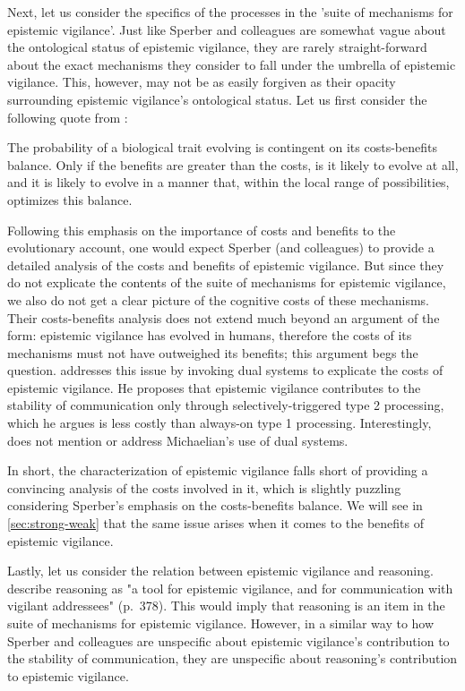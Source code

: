 Next, let us consider the specifics of the processes in the 'suite of mechanisms for epistemic vigilance'. Just like Sperber and colleagues are somewhat vague about the ontological status of epistemic vigilance, they are rarely straight-forward about the exact mechanisms they consider to fall under the umbrella of epistemic vigilance. This, however, may not be as easily forgiven as their opacity surrounding epistemic vigilance's ontological status. Let us first consider the following quote from \citet{Sperber13}:
\begin{quoting}
    The probability of a biological trait evolving is contingent on its costs-benefits balance. Only if the benefits are greater than the costs, is it likely to evolve at all, and it is likely to evolve in a manner that, within the local range of possibilities, optimizes this balance.
    \hfill \citep[p.~62]{Sperber13}
\end{quoting}
Following this emphasis on the importance of costs and benefits to the evolutionary account, one would expect Sperber (and colleagues) to provide a detailed analysis of the costs and benefits of epistemic vigilance.
But since they do not explicate the contents of the suite of mechanisms for epistemic vigilance, we also do not get a clear picture of the cognitive costs of these mechanisms.
Their costs-benefits analysis does not extend much beyond an argument of the form: epistemic vigilance has evolved in humans, therefore the costs of its mechanisms must not have outweighed its benefits; this argument begs the question.
\citet{Michaelian13} addresses this issue by invoking dual systems to explicate the costs of epistemic vigilance. He proposes that epistemic vigilance contributes to the stability of communication only through selectively-triggered type 2 processing, which he argues is less costly than always-on type 1 processing. Interestingly, \citet{Sperber13} does not mention or address Michaelian's use of dual systems.

In short, the characterization of epistemic vigilance falls short of providing a convincing analysis of the costs involved in it, which is slightly puzzling considering Sperber's emphasis on the costs-benefits balance. We will see in \cref{sec:strong-weak} that the same issue arises when it comes to the benefits of epistemic vigilance.

Lastly, let us consider the relation between epistemic vigilance and reasoning. \citet{Sperber10} describe reasoning as "a tool for epistemic vigilance, and for communication with vigilant addressees" (p.~378). This would imply that reasoning is an item in the suite of mechanisms for epistemic vigilance. However, in a similar way to how Sperber and colleagues are unspecific about epistemic vigilance's contribution to the stability of communication, they are unspecific about reasoning's contribution to epistemic vigilance.

